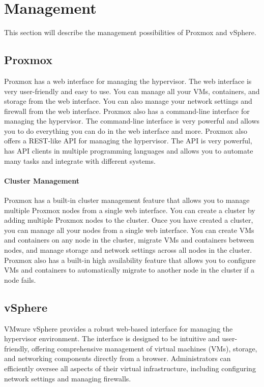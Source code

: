 \section{Management}
This section will describe the management possibilities of Proxmox and vSphere. 

\subsection{Proxmox}
Proxmox has a web interface for managing the hypervisor. The web interface is very user-friendly and easy to use. You can manage all your VMs, containers, and storage from the web interface. You can also manage your network settings and firewall from the web interface. Proxmox also has a command-line interface for managing the hypervisor. The command-line interface is very powerful and allows you to do everything you can do in the web interface and more. Proxmox also offers a REST-like API for managing the hypervisor. The API is very powerful, has API clients in multiple programming languages and allows you to automate many tasks and integrate with different systems. 
\paragraph{Cluster Management} 
Proxmox has a built-in cluster management feature that allows you to manage multiple Proxmox nodes from a single web interface. You can create a cluster by adding multiple Proxmox nodes to the cluster. Once you have created a cluster, you can manage all your nodes from a single web interface. You can create VMs and containers on any node in the cluster, migrate VMs and containers between nodes, and manage storage and network settings across all nodes in the cluster. Proxmox also has a built-in high availability feature that allows you to configure VMs and containers to automatically migrate to another node in the cluster if a node fails. 

\subsection{vSphere}

VMware vSphere provides a robust web-based interface for managing the hypervisor environment. The interface is designed to be intuitive and user-friendly, offering comprehensive management of virtual machines (VMs), storage, and networking components directly from a browser. Administrators can efficiently oversee all aspects of their virtual infrastructure, including configuring network settings and managing firewalls.

